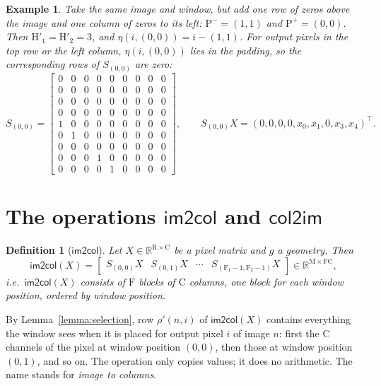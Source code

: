 \documentclass[twoside,11pt]{article}
\newtheorem{example}{Example}
\newtheorem{definition}{Definition}
\newcommand{\const}[1]{\ensuremath{\mathrm{#1}}} %
\newcommand{\func}[1]{\ensuremath{\textsf{#1}}}  %
\newcommand{\Reals}{\mathbb{R}}
\newcommand{\Hout}{\const{H}'}       %
\newcommand{\Fs}{\const{F}}          %
\newcommand{\Pb}{\const{P}^{-}}      %
\newcommand{\Pa}{\const{P}^{+}}      %
\newcommand{\im}{\func{im2col}}
\newcommand{\ci}{\func{col2im}}
\begin{document}
\begin{example} \label{example:selection-padding}
Take the same image and window, but add one row of zeros above the image and one column of zeros to its left: $\Pb = (1,1)$ and $\Pa = (0,0)$.
Then $\Hout_1 = \Hout_2 = 3$, and $\eta(i, (0,0)) = i - (1,1)$.
For output pixels in the top row or the left column, $\eta(i, (0,0))$ lies in the padding, so the corresponding rows of $S_{(0,0)}$ are zero:
\[
S_{(0,0)} =
\begin{bmatrix}
0 & 0 & 0 & 0 & 0 & 0 & 0 & 0 & 0 \\
0 & 0 & 0 & 0 & 0 & 0 & 0 & 0 & 0 \\
0 & 0 & 0 & 0 & 0 & 0 & 0 & 0 & 0 \\
0 & 0 & 0 & 0 & 0 & 0 & 0 & 0 & 0 \\
1 & 0 & 0 & 0 & 0 & 0 & 0 & 0 & 0 \\
0 & 1 & 0 & 0 & 0 & 0 & 0 & 0 & 0 \\
0 & 0 & 0 & 0 & 0 & 0 & 0 & 0 & 0 \\
0 & 0 & 0 & 1 & 0 & 0 & 0 & 0 & 0 \\
0 & 0 & 0 & 0 & 1 & 0 & 0 & 0 & 0
\end{bmatrix},
\qquad
S_{(0,0)} X = (0, 0, 0, 0, x_0, x_1, 0, x_3, x_4)^\top.
\]
\end{example}

\section{The operations \im{} and \ci} \label{section:im2col}

\begin{definition}[\im] \label{def:im2col}
Let $X \in \Reals^{\const{R} \times \const{C}}$ be a pixel matrix and $g$ a geometry. Then
\[
\im(X) = \begin{bmatrix} S_{(0,0)} X & S_{(0,1)} X & \cdots & S_{(\Fs_1-1, \Fs_2-1)} X \end{bmatrix} \in \Reals^{\const{M} \times \Fs \const{C}},
\]
i.e.\ $\im(X)$ consists of $\Fs$ blocks of $\const{C}$ columns, one block for each window position, ordered by window position.
\end{definition}
\noindent
By Lemma~\ref{lemma:selection}, row $\rho'(n,i)$ of $\im(X)$ contains everything the window sees when it is placed for output pixel $i$ of image $n$: first the $\const{C}$ channels of the pixel at window position $(0,0)$, then those at window position $(0,1)$, and so on.
The operation only copies values; it does no arithmetic.
The name stands for \emph{image to columns}.
\end{document}

